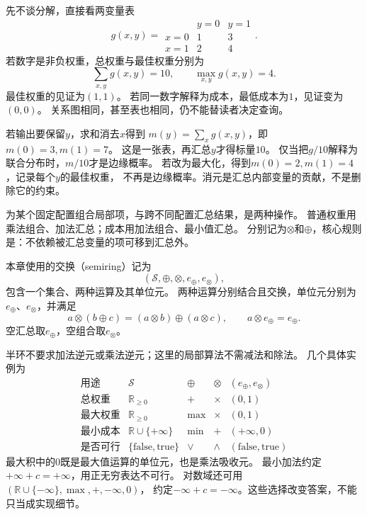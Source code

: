 先不谈分解，直接看两变量表
\[
  g(x,y)=
  \begin{array}{c|cc}
    &y=0&y=1\\ \hline
    x=0&1&3\\
    x=1&2&4
  \end{array}.
\]
若数字是非负权重，总权重与最佳权重分别为
\[
  \sum_{x,y}g(x,y)=10,\qquad \max_{x,y}g(x,y)=4.
\]
最佳权重的见证为\((1,1)\)。
若同一数字解释为成本，最低成本为\(1\)，见证变为\((0,0)\)。
关系图相同，甚至表也相同，仍不能替读者决定查询。

若输出要保留\(y\)，求和消去\(x\)得到
\(m(y)=\sum_xg(x,y)\)，即\(m(0)=3,m(1)=7\)。
这是一张表，再汇总\(y\)才得标量\(10\)。
仅当把\(g/10\)解释为联合分布时，\(m/10\)才是边缘概率。
若改为最大化，得到\(m(0)=2,m(1)=4\)，记录每个\(y\)的最佳权重，
不再是边缘概率。消元是汇总内部变量的贡献，不是删除它的约束。

为某个固定配置组合局部项，与跨不同配置汇总结果，是两种操作。
普通权重用乘法组合、加法汇总；成本用加法组合、最小值汇总。
分别记为\(\otimes\)和\(\oplus\)，核心规则是：不依赖被汇总变量的项可移到汇总外。

\begin{definition}[交换半环]
  \label{def:graph-theory-semiring}
  本章使用的交换（semiring）记为
  \[
    (\mathcal S,\oplus,\otimes,e_{\oplus},e_{\otimes}),
  \]
  包含一个集合、两种运算及其单位元。
  两种运算分别结合且交换，单位元分别为\(e_{\oplus}\)、\(e_{\otimes}\)，并满足
  \[
    a\otimes(b\oplus c)=(a\otimes b)\oplus(a\otimes c),\qquad
    a\otimes e_{\oplus}=e_{\oplus}.
  \]
  空汇总取\(e_{\oplus}\)，空组合取\(e_{\otimes}\)。
\end{definition}

半环不要求加法逆元或乘法逆元；这里的局部算法不需减法和除法。
几个具体实例为
\[
  \begin{array}{c|c|c|c|c}
    \text{用途}&\mathcal S&\oplus&\otimes&(e_{\oplus},e_{\otimes})\\ \hline
    \text{总权重}&\mathbb R_{\geq0}&+&\times&(0,1)\\
    \text{最大权重}&\mathbb R_{\geq0}&\max&\times&(0,1)\\
    \text{最小成本}&\mathbb R\cup\{+\infty\}&\min&+&(+\infty,0)\\
    \text{是否可行}&\{\mathrm{false},\mathrm{true}\}&\lor&\land&
       (\mathrm{false},\mathrm{true})
  \end{array}
\]
最大积中的\(0\)既是最大值运算的单位元，也是乘法吸收元。
最小加法约定\(+\infty+c=+\infty\)，用正无穷表达不可行。
对数域还可用\((\mathbb R\cup\{-\infty\},\max,+,-\infty,0)\)，
约定\(-\infty+c=-\infty\)。这些选择改变答案，不能只当成实现细节。

